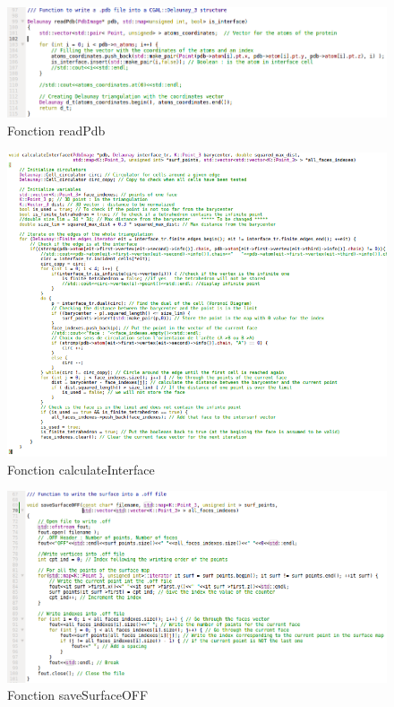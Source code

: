 \begin{figure}[ht]
\centering
  \includegraphics[width=\textwidth]{figures/readPdb.png}
  \caption{Fonction readPdb}
  \label{fig::read_pdb}
\end{figure}

\begin{figure}[ht]
\centering
  \includegraphics[width=\textwidth]{figures/calculate_interface.png}
  \caption{Fonction calculateInterface}
  \label{fig::calculate_interface}
\end{figure}

\begin{figure}[ht]
\centering
  \includegraphics[width=\textwidth]{figures/save_surface_off.png}
  \caption{Fonction saveSurfaceOFF}
  \label{fig::save_surface_off}
\end{figure}
